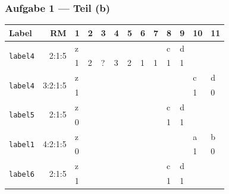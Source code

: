 \documentclass{beamer}
\begin{document}
\begin{frame} \frametitle{Aufgabe 1 --- Teil (b)}
	\centering
	\small
	\def\arraystretch{0.9}
	
	\begin{tabular}{|p{1.4cm}|r||R{0.2cm}|R{0.2cm}|R{0.2cm}|R{0.2cm}|R{0.2cm}|R{0.2cm}|R{0.2cm}|R{0.2cm}|R{0.2cm}|R{0.2cm}|R{0.2cm}|}
		\hline
		Label & RM & 1 & 2 & 3 & 4 & 5 & 6 & 7 & 8 & 9 & 10 & 11 \\ 
		\hline \hline
		[0]{*}{\texttt{label4}} & [0]{*}{2:1:5} & z &  &  &       &       &       &       & c & d & &\\
		&       & 1     & 2     & ? & 3     & 2     & 1     & 1     & 1     & 1  &&\\ \hline
		[0]{*}{\texttt{label4}} & [0]{*}{3:2:1:5} & z &       &       &  &  &       &       &       &  & c & d\\
		&       & 1    &       &       &      &      &       &       &       & & 1 & 0 \\ \hline
		[0]{*}{\texttt{label5}} & [0]{*}{2:1:5} & z &       &       &       &       &  &  &      c & d & &\\
		&       & 0     &       &       &       &       &      &      &  1     & 1 & &\\ \hline
		[0]{*}{\texttt{label1}} & [0]{*}{4:2:1:5} & z &       &       &       &       &       &       & & & a & b\\
		&       & 0     &       &       &       &       &       &       &      &  & 1 & 0\\ \hline
		[0]{*}{\texttt{label6}} & [0]{*}{2:1:5} & z &       &       &       &       &  &  &      c & d& & \\
		&       & 1     &       &       &       &       &      &      &  1  & 1 & & \\ \hline
	\end{tabular}
\end{frame}
\end{document}
